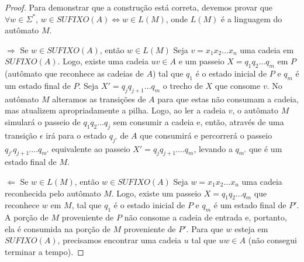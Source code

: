 \begin{proof} Para demonstrar que a construção está correta, devemos provar que $\forall w \in \Sigma^*$, $w \in SUFIXO(A) \iff w \in L(M)$, onde $L(M)$ é a linguagem do autômato $M$.

$\Rightarrow$ Se $w \in SUFIXO(A)$, então $w \in L(M)$
Seja $v = x_1x_2 \ldots x_n$ uma cadeia em $SUFIXO(A)$. Logo, existe uma cadeia $uv \in A$ e um passeio $X = q_1q_2 \ldots q_m$ em $P$ (autômato que reconhece as cadeias de $A$) tal que $q_1$ é o estado inicial de $P$ e $q_m$ é um estado final de $P$. Seja $X' = q_jq_{j+1} \ldots q_m$ o trecho de $X$ que consome $v$. No autômato $M$ alteramos as transições de $A$ para que estas não consumam a cadeia, mas atualizem apropriadamente a pilha. Logo, ao ler a cadeia $v$, o autômato $M$ simulará o passeio de $q_1q_2 \ldots q_j$ sem consumir a cadeia e, então, através de uma transição $\epsilon$ irá para o estado $q_{j'}$ de $A$ que consumirá e percorrerá o passeio $q_{j'}q_{j+1'} \ldots q_{m'}$ equivalente ao passeio $X' = q_jq_{j+1'} \ldots q_m$, levando a $q_{m'}$ que é um estado final de $M$.

$\Leftarrow$ Se $w \in L(M)$, então $w \in SUFIXO(A)$
Seja $w = x_1x_2 \ldots x_n$ uma cadeia reconhecida pelo autômato $M$. Logo, existe um passeio $X = q_1q_2 \ldots q_m$ que reconhece $w$ em $M$, tal que $q_1$ é o estado inicial de $P$ e $q_m$ é um estado final de $P'$. A porção de $M$ proveniente de $P$ não consome a cadeia de entrada e, portanto, ela é consumida na porção de $M$ proveniente de $P'$. Para que $w$ esteja em $SUFIXO(A)$, precisamos encontrar uma cadeia $u$ tal que $uw \in A$ (não consegui terminar a tempo).
\end{proof}